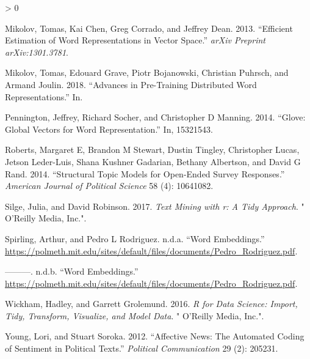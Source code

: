 \documentclass[
]{book}
\newlength{\cslhangindent}
\newenvironment{CSLReferences}[2] %
 {%
  \setlength{\parindent}{0pt}
  \ifodd #1 \everypar{\setlength{\hangindent}{\cslhangindent}}\ignorespaces\fi
  \ifnum #2 > 0
  \setlength{\parskip}{#2\baselineskip}
  \fi
 }%
 {}
\begin{document}
\begin{CSLReferences}{1}{0}
\leavevmode\hypertarget{ref-mikolov2013efficient}{}%
Mikolov, Tomas, Kai Chen, Greg Corrado, and Jeffrey Dean. 2013.
{``Efficient Estimation of Word Representations in Vector Space.''}
\emph{arXiv Preprint arXiv:1301.3781}.

\leavevmode\hypertarget{ref-mikolov2018advances}{}%
Mikolov, Tomas, Edouard Grave, Piotr Bojanowski, Christian Puhrsch, and
Armand Joulin. 2018. {``Advances in Pre-Training Distributed Word
Representations.''} In.

\leavevmode\hypertarget{ref-pennington2014glove}{}%
Pennington, Jeffrey, Richard Socher, and Christopher D Manning. 2014.
{``Glove: Global Vectors for Word Representation.''} In, 15321543.

\leavevmode\hypertarget{ref-roberts2014structural}{}%
Roberts, Margaret E, Brandon M Stewart, Dustin Tingley, Christopher
Lucas, Jetson Leder-Luis, Shana Kushner Gadarian, Bethany Albertson, and
David G Rand. 2014. {``Structural Topic Models for Open-Ended Survey
Responses.''} \emph{American Journal of Political Science} 58 (4):
10641082.

\leavevmode\hypertarget{ref-silge2017text}{}%
Silge, Julia, and David Robinson. 2017. \emph{Text Mining with r: A Tidy
Approach}. {"} O'Reilly Media, Inc.{"}.

\leavevmode\hypertarget{ref-spirlingword}{}%
Spirling, Arthur, and Pedro L Rodriguez. n.d.a. {``Word Embeddings.''}
\url{https://polmeth.mit.edu/sites/default/files/documents/Pedro_Rodriguez.pdf}.

\leavevmode\hypertarget{ref-spirlingworda}{}%
---------. n.d.b. {``Word Embeddings.''}
\url{https://polmeth.mit.edu/sites/default/files/documents/Pedro_Rodriguez.pdf}.

\leavevmode\hypertarget{ref-wickham2016r}{}%
Wickham, Hadley, and Garrett Grolemund. 2016. \emph{R for Data Science:
Import, Tidy, Transform, Visualize, and Model Data}. {"} O'Reilly Media,
Inc.{"}.

\leavevmode\hypertarget{ref-young2012affective}{}%
Young, Lori, and Stuart Soroka. 2012. {``Affective News: The Automated
Coding of Sentiment in Political Texts.''} \emph{Political
Communication} 29 (2): 205231.

\end{CSLReferences}

\backmatter
\end{document}
